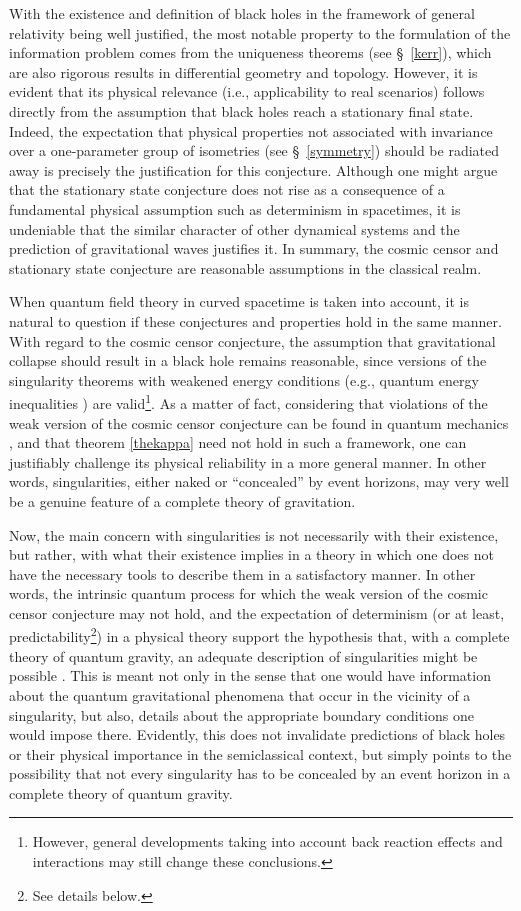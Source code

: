 \documentclass[
12pt,		%
openright,	%
twoside,  %
a4paper,			%
chapter=TITLE,		%
english,			%
french,				%
spanish,			%
brazil				%
]{USPSC-classe/USPSC}
\begin{document}
With the existence and definition of black holes in the framework of general relativity being well justified, the most notable property to the formulation of the information problem comes from the uniqueness theorems (see \S~\ref{kerr}), which are also rigorous results in differential geometry and topology. However, it is evident that its physical relevance (i.e., applicability to real scenarios) follows directly from the assumption that black holes reach a stationary final state. Indeed, the expectation that physical properties not associated with invariance over a one-parameter group of isometries (see \S~\ref{symmetry}) should be radiated away is precisely the justification for this conjecture. Although one might argue that the stationary state conjecture does not rise as a consequence of a fundamental physical assumption such as determinism in spacetimes, it is undeniable that the similar character of other dynamical systems and the prediction of gravitational waves justifies it. In summary, the cosmic censor and stationary state conjecture are reasonable assumptions in the classical realm.

When quantum field theory in curved spacetime is taken into account, it is natural to question if these conjectures and properties hold in the same manner. With regard to the cosmic censor conjecture, the assumption that gravitational collapse should result in a black hole remains reasonable, since versions of the singularity theorems with weakened energy conditions (e.g., quantum energy inequalities \cite{Fewster2011}) are valid\footnote{However, general developments taking into account back reaction effects and interactions may still change these conclusions.}. As a matter of fact, considering that violations of the weak version of the cosmic censor conjecture can be found in quantum mechanics \cite{Matsas2009}, and that theorem \ref{thekappa} need not hold in such a framework, one can justifiably challenge its physical reliability in a more general manner. In other words, singularities, either naked or ``concealed'' by event horizons, may very well be a genuine feature of a complete theory of gravitation.

Now, the main concern with singularities is not necessarily with their existence, but rather, with what their existence implies in a theory in which one does not have the necessary tools to describe them in a satisfactory manner. In other words, the intrinsic quantum process for which the weak version of the cosmic censor conjecture may not hold, and the expectation of determinism (or at least, predictability\footnote{See details below.}) in a physical theory support the hypothesis that, with a complete theory of quantum gravity, an adequate description of singularities might be possible \cite{Penrose1979}. This is meant not only in the sense that one would have information about the quantum gravitational phenomena that occur in the vicinity of a singularity, but also, details about the appropriate boundary conditions one would impose there. Evidently, this does not invalidate predictions of black holes or their physical importance in the semiclassical context, but simply points to the possibility that not every singularity has to be concealed by an event horizon in a complete theory of quantum gravity. 
\end{document}
